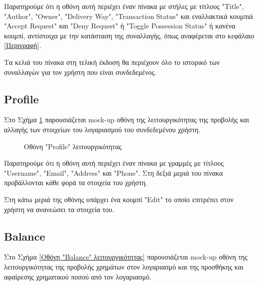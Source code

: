 \documentclass[12pt,a4paper]{article}
\begin{document}
Παρατηρούμε ότι η οθόνη αυτή περιέχει έναν πίνακα με στήλες με τίτλους "Title", "Author", "Owner", "Delivery Way", "Transaction Status" και εναλλακτικά κουμπιά "Accept Request" και "Deny Request" ή "Toggle Possession Status" ή κανένα κουμπί, αντίστοιχα με την κατάσταση της συναλλαγής, όπως αναφέρεται στο κεφάλαιο \ref{Περιγραφή}.

Τα κελιά του πίνακα στη τελική έκδοση θα περιέχουν όλο το ιστορικό των συναλλαγών για τον χρήστη που είναι συνδεδεμένος.

\subsection{Profile}

Στο Σχήμα \ref{Οθόνη "Profile" λειτουργικότητας} παρουσιάζεται mock-up οθόνη της λειτουργικότητας της προβολής και αλλαγής των στοιχείων του λογαριασμού του συνδεδεμένου χρήστη.

\begin{figure}[H]
	\caption{Οθόνη "Profile" λειτουργικότητας}
	\label{Οθόνη "Profile" λειτουργικότητας}
\end{figure}

Παρατηρούμε ότι η οθόνη αυτή περιέχει έναν πίνακα με γραμμές με τίτλους "Username", "Email", "Address" και "Phone". Στη δεξιά μεριά του πίνακα προβάλλονται κάθε φορά τα στοιχεία του χρήστη.

Στη κάτω μεριά της οθόνης υπάρχει ένα κουμπί "Edit" το οποίο επιτρέπει στον χρήστη να ανανεώσει τα στοιχεία του.

\subsection{Balance}

Στο Σχήμα \ref{Οθόνη "Balance" λειτουργικότητας} παρουσιάζεται mock-up οθόνη της λειτουργικότητας της προβολής χρημάτων στον λογαριασμό και της προσθήκης και αφαίρεσης χρηματικού ποσού από τον λογαριασμό.
\end{document}
